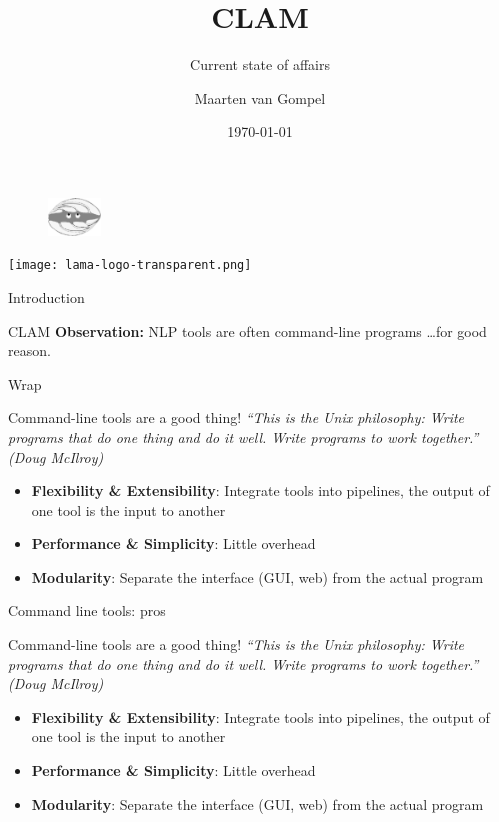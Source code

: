 \documentclass[xcolor=table,10pt,t]{beamer}
\title{CLAM}
\subtitle{Current state of affairs}
\date{\today}
\author{Maarten van Gompel}
\begin{document}
\begin{frame}
  \titlepage
        \begin{figure}
          \includegraphics[height=1cm]{clamup_bw.png}
        \end{figure}
        \vspace{3.5cm}
      \texttt{[image: lama-logo-transparent.png]}
\end{frame}



\begin{frame}{Introduction}
  \begin{block}{CLAM}
    \textbf{Observation:} NLP tools are often command-line programs \ldots for
    good reason.
  \end{block}
\end{frame}


\begin{frame}{Wrap}
  \begin{block}{Command-line tools are a good thing!}
      \emph{``This is the Unix philosophy: Write programs that do one thing and do
      it well. Write programs to work together.'' (Doug McIlroy)}
      
      \begin{itemize}
        \item \textbf{Flexibility \& Extensibility}: Integrate tools into pipelines, the output of one tool is the input to another
        \item \textbf{Performance \& Simplicity}: Little overhead
        \item \textbf{Modularity}: Separate the interface (GUI, web) from the actual program
      \end{itemize}
      
  \end{block}
\end{frame}

\begin{frame}{Command line tools: pros}
  \begin{block}{Command-line tools are a good thing!}
      \emph{``This is the Unix philosophy: Write programs that do one thing and do
      it well. Write programs to work together.'' (Doug McIlroy)}
      
      \begin{itemize}
        \item \textbf{Flexibility \& Extensibility}: Integrate tools into pipelines, the output of one tool is the input to another
        \item \textbf{Performance \& Simplicity}: Little overhead
        \item \textbf{Modularity}: Separate the interface (GUI, web) from the actual program
      \end{itemize}
      
  \end{block}

\end{frame}
\end{document}
